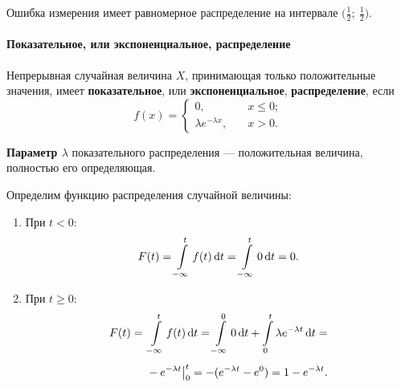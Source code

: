 \documentclass[a4paper]{article}
\newcommand{\sleq}{\leqslant}
\newcommand{\sgeq}{\geqslant}
\newcommand{\key}[1]{{\color{Medium}\bfseries #1}}
\begin{document}
                    Ошибка измерения имеет равномерное распределение на интервале $\big( \frac{1}{2} ; \: \frac{1}{2} \big)$.

                \paragraph{Показательное, или экспоненциальное, распределение}

                    Непрерывная случайная величина $X$, принимающая только положительные значения, имеет \key{показательное}, или \key{экспоненциальное}, \key{распределение}, если
                    \begin{equation*}
                        f(x) =
                        \begin{cases}
                            0 , \quad & x \sleq 0 ; \\[1.0ex]
                            \lambda e^{-\lambda x} , \quad & x > 0 .
                        \end{cases}
                    \end{equation*}

                    \key{Параметр \boldmath$\lambda$} показательного распределения --- положительная величина, полностью его определяющая.

                    Определим функцию распределения случайной величины:

                    \begin{enumerate}
                        \item При $t < 0$:
                        \begin{equation*}
                            F(t) = \int\limits_{-\infty}^{t} f(t) \dif t =
                                \int\limits_{-\infty}^{t} 0 \dif t = 0 .
                        \end{equation*}

                        \item При $t \sgeq 0$:
                        \begin{equation*}
                            \begin{aligned}
                                F(t) = ~& \int\limits_{-\infty}^{t} f(t) \dif t =
                                    \int\limits_{-\infty}^{0} 0 \dif t +
                                    \int\limits_{0}^{t} \lambda e^{-\lambda t} \dif t = \\[1.0ex]
                                & -e^{-\lambda t} \big|_{0}^{t} =
                                    -(e^{-\lambda t} - e^0) = 1 - e^{-\lambda t} .
                            \end{aligned}
                        \end{equation*}
                    \end{enumerate}
\end{document}
